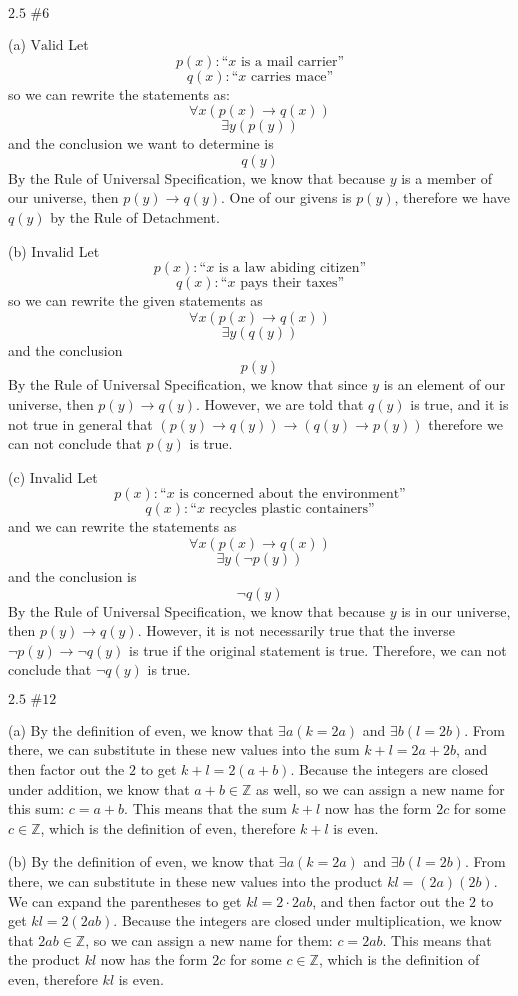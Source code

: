 \documentclass{article}
\newcommand{\problem}[2]{$\boxed{\text{#1 \##2}}$}
\newcommand{\subproblem}[1]{(#1)}
\newcommand{\RUS}{Rule of Universal Specification}
\begin{document}
\begin{multicols*}{2}

\problem{2.5}{6}

\subproblem{a} $\boxed{\text{Valid}}$ Let \[
p(x):\text{``$x$ is a mail carrier''}
\] \[
q(x):\text{``$x$ carries mace''}
\] so we can rewrite the statements as: \[
\forall x(p(x)\rightarrow q(x))
\] \[
\exists y(p(y))
\] and the conclusion we want to determine is \[
q(y)
\] By the \RUS, we know that because $y$ is a member of our universe,
then $p(y)\rightarrow{}q(y)$. One of our givens is $p(y)$, therefore
we have $q(y)$ by the Rule of Detachment.

\subproblem{b} $\boxed{\text{Invalid}}$ Let \[
p(x):\text{``$x$ is a law abiding citizen''}
\] \[
q(x):\text{``$x$ pays their taxes''}
\] so we can rewrite the given statements as \[
\forall x(p(x)\rightarrow q(x))
\] \[
\exists y(q(y))
\] and the conclusion \[
p(y)
\] By the \RUS, we know that since $y$ is an element of our universe,
then $p(y)\rightarrow{}q(y)$. However, we are told that $q(y)$ is
true, and it is not true in general that
$(p(y)\rightarrow{}q(y))\rightarrow(q(y)\rightarrow{}p(y))$ therefore
we can not conclude that $p(y)$ is true.

\subproblem{c} $\boxed{\text{Invalid}}$ Let \[
p(x):\text{``$x$ is concerned about the environment''}
\] \[
q(x):\text{``$x$ recycles plastic containers''}
\] and we can rewrite the statements as \[
\forall x(p(x)\rightarrow q(x))
\] \[
\exists y(\neg p(y))
\] and the conclusion is \[
\neg q(y)
\] By the \RUS, we know that because $y$ is in our universe, then
$p(y)\rightarrow{}q(y)$. However, it is not necessarily true that the
inverse $\neg{}p(y)\rightarrow\neg{}q(y)$ is true if the original
statement is true. Therefore, we can not conclude that $\neg{}q(y)$ is
true.


%

\problem{2.5}{12}

\subproblem{a} By the definition of even, we know that
$\exists{}a(k=2a)$ and $\exists{}b(l=2b)$. From there, we can
substitute in these new values into the sum $k+l=2a+2b$, and then
factor out the $2$ to get $k+l=2(a+b)$. Because the integers are
closed under addition, we know that $a+b\in\mathbb{Z}$ as well, so we
can assign a new name for this sum: $c=a+b$. This means that the sum
$k+l$ now has the form $2c$ for some $c\in\mathbb{Z}$, which is the
definition of even, therefore $k+l$ is even.

\subproblem{b} By the definition of even, we know that
$\exists{}a(k=2a)$ and $\exists{}b(l=2b)$. From there, we can
substitute in these new values into the product $kl=(2a)(2b)$. We can
expand the parentheses to get $kl=2\cdot{}2ab$, and then factor out
the $2$ to get $kl=2(2ab)$. Because the integers are closed under
multiplication, we know that $2ab\in\mathbb{Z}$, so we can assign a
new name for them: $c=2ab$. This means that the product $kl$ now has
the form $2c$ for some $c\in\mathbb{Z}$, which is the definition of
even, therefore $kl$ is even.


\end{multicols*}
\end{document}
